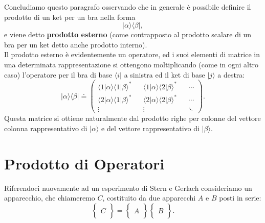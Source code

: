 Concludiamo questo paragrafo osservando che in generale è possibile definire il prodotto di un ket per un bra nella forma
	\begin{equation}
		\boxed{\boxed{
			| \alpha \rangle \langle \beta |  ,
			}}
	\end{equation}
e viene detto \textbf{prodotto esterno} (come contrapposto al prodotto scalare di un bra per un ket detto anche prodotto interno).\\
Il prodotto esterno è evidentemente un operatore, ed i suoi elementi di matrice in una determinata rappresentazione si ottengono moltiplicando (come in ogni altro caso) l'operatore per il bra di base $\langle i |$ a sinistra ed il ket di base $| j \rangle$ a destra:
	\begin{equation}
		\boxed{
			| \alpha \rangle \langle \beta | \doteq
			\begin{pmatrix}
			\langle 1 | \alpha \rangle \langle 1 | \beta \rangle ^* && \langle 1 | \alpha \rangle \langle 2 | \beta \rangle ^* && \cdots \\
			\langle 2 | \alpha \rangle \langle 1 | \beta \rangle ^* && \langle 2 | \alpha \rangle \langle 2 | \beta \rangle ^* &&  \cdots \\
			\vdots && \vdots && \ddots
			\end{pmatrix} .
			}
	\end{equation}
Questa matrice si ottiene naturalmente dal prodotto righe per colonne del vettore colonna rappresentativo di $| \alpha \rangle$ e del vettore rappresentativo di $| \beta \rangle$.
\section{Prodotto di Operatori}

Riferendoci nuovamente ad un esperimento di Stern e Gerlach consideriamo un apparecchio, che chiameremo $C$, costituito da due apparecchi $A$ e $B$ posti in serie:
	\begin{equation}
		\begin{Bmatrix}
		\ \\ C \\ \
		\end{Bmatrix}=
		\begin{Bmatrix}
		\ \\ A \\ \
		\end{Bmatrix}
		\begin{Bmatrix}
		\ \\ B \\ \
		\end{Bmatrix} .
	\end{equation}

